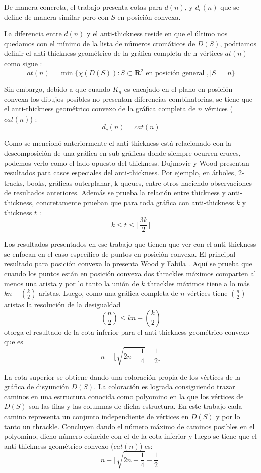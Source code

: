 De manera concreta, el trabajo presenta cotas para $d(n)$, y $d_c(n)$ que se define
de manera similar pero con $S$ en posición convexa.

La diferencia entre $d(n)$ y el anti-thickness reside en que el último nos quedamos
con el mínimo de la lista de números cromáticos de $D(S)$, podriamos definir el
anti-thickness geométrico de la gráfica completa de n vértices $at(n)$ como sigue :
\[ at(n) = \min\{\chi(D(S)): S \subset \mathbf{R}^2 \text{ en posición general }, |S|=n\}\]

Sin embargo, debido a que cuando $K_n$ es encajado en el plano en posición convexa
los dibujos posibles no presentan diferencias combinatorias, se tiene que el
anti-thickness geométrico convexo de la gráfica completa de $n$ vértices ($cat(n)$) :
\[ d_c(n) = cat(n)\]

Como se mencionó anteriormente el anti-thickness está relacionado con la descomposición
de una gráfica en sub-gráficas donde siempre ocurren cruces, podemos verlo como
el lado opuesto del thickness. Dujmovic y Wood \cite{Dujmovic2017} presentan resultados
para casos especiales del anti-thickness. Por ejemplo, en árboles, 2-tracks, books, gráficas
outerplanar, k-queues, entre otros haciendo observaciones de resultados anteriores.
Además se prueba la relación entre thickness y anti-thickness, concretamente prueban que
para toda gráfica con anti-thickness $k$ y thickness $t$
: \[ k \leq t \leq \lceil \frac{3k}{2}\rceil \]

Los resultados presentados en ese trabajo que tienen que ver con el anti-thickness se enfocan
en el caso específico de puntos en posición convexa. El principal resultado para
posición convexa lo presenta Wood y Fabila \cite{Fabila-Monroy2018}.
Aquí se prueba que cuando los puntos están en posición convexa dos thrackles máximos
comparten al menos una arista y por lo tanto la unión de $k$ thrackles máximos tiene
a lo más $kn - \binom{k}{2}$ aristas. Luego, como una gráfica completa de $n$
vértices tiene $\binom{n}{2}$ aristas la resolución de la desigualdad
\[ \binom{n}{2} \leq kn - \binom{k}{2} \]
otorga el resultado de la cota inferior para el anti-thickness geométrico convexo que es
\[ n - \lfloor \sqrt{2n + \frac{1}{4}} - \frac{1}{2} \rfloor \]

La cota superior se obtiene dando una coloración propia de los vértices de la gráfica
de disyunción $D(S)$. La coloración es lograda consiguiendo trazar caminos en una
estructura conocida como polyomino en la que los vértices de $D(S)$ son las filas
y las columnas de dicha estructura. En este trabajo cada camino representa un
conjunto independiente de vértices en $D(S)$ y por lo tanto un thrackle. Concluyen
dando el número máximo de caminos posibles en el polyomino, dicho número coincide con
el de la cota inferior y luego se tiene que el anti-thickness geométrico convexo ($cat(n)$) es:
\[ n - \lfloor \sqrt{2n + \frac{1}{4}} - \frac{1}{2} \rfloor \]

